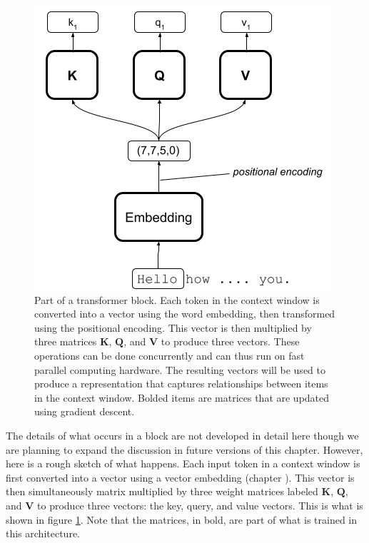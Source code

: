 \begin{figure}[h]
\centering
\includegraphics[scale=.4]{./images/transformerBlockBasic.png}
\caption[Jeff Yoshimi with consultation from Tim Meyer.]{Part of a transformer block. Each token in the context window is converted into a vector using the word embedding, then transformed using the positional encoding. This vector is then multiplied by three matrices $\textbf{K}$, $\textbf{Q}$, and $\textbf{V}$ to produce three vectors. These operations can be done concurrently and can thus run on fast parallel computing hardware. The resulting vectors will be used to produce a representation that captures relationships between items in the context window. Bolded items are matrices that are updated using gradient descent.}
\label{transformerBlockSimple}
\end{figure}

The details of what occurs in a block are not developed in detail here though we are planning to expand the discussion in future versions of this chapter. However, here is a rough sketch of what happens. Each input token in a context window is first converted into a vector using a vector embedding (chapter ). This vector is then simultaneously matrix multiplied by three weight matrices labeled $\textbf{K}$, $\textbf{Q}$, and $\textbf{V}$ to produce three vectors: the key, query, and value vectors. This is what is shown in figure \ref{transformerBlockSimple}. Note that the matrices, in bold, are part of what is trained in this architecture.

